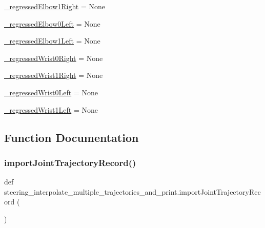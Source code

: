 \begin{DoxyCompactItemize}
\mbox{\hyperlink{namespacesteering__interpolate__multiple__trajectories__and__print_a3689faeaf99e3d97698c6b22b73c4c12}{\+\_\+regressed\+Elbow1\+Right}} = None
\item 
\mbox{\hyperlink{namespacesteering__interpolate__multiple__trajectories__and__print_ae7ab4469cf5dc2b368e5d8d6b9f79ab0}{\+\_\+regressed\+Elbow0\+Left}} = None
\item 
\mbox{\hyperlink{namespacesteering__interpolate__multiple__trajectories__and__print_a9d4d2667d21c5a16b876d86a0d62c1a7}{\+\_\+regressed\+Elbow1\+Left}} = None
\item 
\mbox{\hyperlink{namespacesteering__interpolate__multiple__trajectories__and__print_aaacdc9fde66962dbad14df4e0d2dce34}{\+\_\+regressed\+Wrist0\+Right}} = None
\item 
\mbox{\hyperlink{namespacesteering__interpolate__multiple__trajectories__and__print_aa0ecde8ae6f1f4da8ee021071dcd8638}{\+\_\+regressed\+Wrist1\+Right}} = None
\item 
\mbox{\hyperlink{namespacesteering__interpolate__multiple__trajectories__and__print_a691d8994f1fb578840efff722cc3d59b}{\+\_\+regressed\+Wrist0\+Left}} = None
\item 
\mbox{\hyperlink{namespacesteering__interpolate__multiple__trajectories__and__print_a6a68a5282fa90f67cc060bb873ed68a7}{\+\_\+regressed\+Wrist1\+Left}} = None
\end{DoxyCompactItemize}


\subsection{Function Documentation}
\mbox{\label{namespacesteering__interpolate__multiple__trajectories__and__print_a5ecaa1f0c7b7379d5d217b69ecbcfafc}} 
\subsubsection{\texorpdfstring{importJointTrajectoryRecord()}{importJointTrajectoryRecord()}}
{\footnotesize\ttfamily def steering\+\_\+interpolate\+\_\+multiple\+\_\+trajectories\+\_\+and\+\_\+print.\+import\+Joint\+Trajectory\+Record (\begin{DoxyParamCaption}{ }\end{DoxyParamCaption})}



